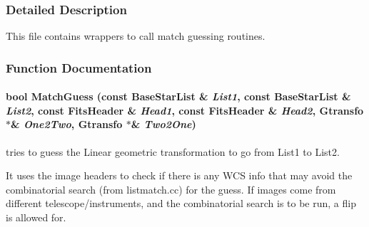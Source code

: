 \subsubsection{Detailed Description}
This file contains wrappers to call match guessing routines.





\subsubsection{Function Documentation}
\paragraph{\setlength{\rightskip}{0pt plus 5cm}bool Match\-Guess (const Base\-Star\-List \& {\em List1}, const Base\-Star\-List \& {\em List2}, const {\bf Fits\-Header} \& {\em Head1}, const {\bf Fits\-Header} \& {\em Head2}, {\bf Gtransfo} $\ast$\& {\em One2Two}, {\bf Gtransfo} $\ast$\& {\em Two2One})}\hfill\label{imagematch_h_a0}


tries to guess the Linear geometric transformation to go from List1 to List2.

It uses the image headers to check if there is any WCS info that may avoid the combinatorial search  (from listmatch.cc) for the guess. If images come from different telescope/instruments, and the combinatorial search  is to be run, a flip is allowed for. 
